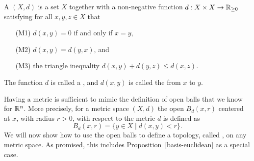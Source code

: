 \begin{defn}
  A  $(X,d)$ is a set $X$ together with a non-negative function $d : X \times X \to \mathbb{R}_{\geq 0}$ satisfying for all $x,y,z \in X$ that
  \begin{enumerate}
    \item[(M1)] $d(x,y) = 0$ if and only if $x = y$,
    \item[(M2)] $d(x,y) = d(y,x)$, and
    \item[(M3)] the triangle inequality $d(x,y) + d(y,z) \leq d(x,z)$.
  \end{enumerate}
  The function $d$ is called a , and $d(x,y)$ is called the  from $x$ to $y$.
\end{defn}
Having a metric is sufficient to mimic the definition of open balls that we know for $\mathbb{R}^n$. More precisely, for a metric space $(X,d)$ the open  $B_d(x,r)$ centered at $x$, with radius $r > 0$, with respect to the metric $d$ is defined as
\[
  B_d(x,r) = \{ y \in X \mid d(x,y) < r \}.
\]
We will now show how to use the open balls to define a topology, called , on any metric space. As promised, this includes Proposition~\ref{basis-euclidean} as a special case.

